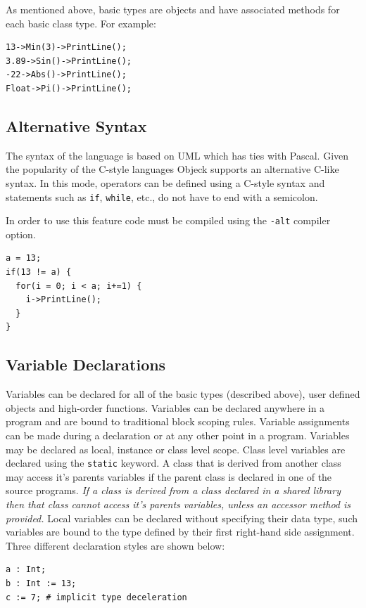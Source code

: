 \documentclass[11pt]{article}
\begin{document}
As mentioned above, basic types are objects and have associated
methods for each basic class type.  For example:

\begin{verbatim}
13->Min(3)->PrintLine();
3.89->Sin()->PrintLine();
-22->Abs()->PrintLine();
Float->Pi()->PrintLine();
\end{verbatim}

\subsection{Alternative Syntax}
The syntax of the language is based on UML which has ties with Pascal.  Given 
the popularity of the C-style languages Objeck supports an alternative C-like 
syntax.  In this mode, operators can be defined using a C-style syntax and 
statements such as \texttt{if}, \texttt{while}, etc., do not have to end with 
a semicolon.

In order to use this feature code must be compiled using the \texttt{-alt} 
compiler option.

\begin{verbatim}
a = 13;
if(13 != a) {
  for(i = 0; i < a; i+=1) {
    i->PrintLine();
  }
}
\end{verbatim}

\subsection{Variable Declarations}
Variables can be declared for all of the basic types (described
above), user defined objects and high-order functions. Variables can
be declared anywhere in a program and are bound to traditional block
scoping rules.  Variable assignments can be made during a declaration
or at any other point in a program. Variables may be declared as
local, instance or class level scope.  Class level variables are
declared using the \texttt{static} keyword. A class that is derived
from another class may access it's parents variables if the parent
class is declared in one of the source programs.  \textit{If a class
  is derived from a class declared in a shared library then that class
  cannot access it's parents variables, unless an accessor method is
  provided.}  Local variables can be declared without specifying their
data type, such variables are bound to the type defined by their first
right-hand side assignment. Three different declaration styles are
shown below:

\begin{verbatim}
a : Int;
b : Int := 13;
c := 7; # implicit type deceleration 
\end{verbatim}
\end{document}
